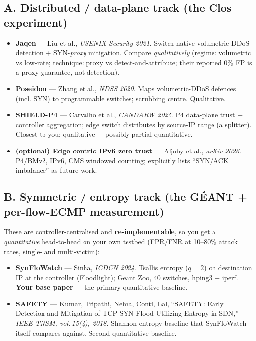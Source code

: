 \documentclass[11pt]{article}
\begin{document}
\subsection*{A. Distributed / data-plane track (the Clos experiment)}
\begin{itemize}[leftmargin=1.4em]
  \item \textbf{Jaqen} --- Liu et al., \emph{USENIX Security 2021}. Switch-native volumetric DDoS
  detection + SYN-\emph{proxy} mitigation. Compare \emph{qualitatively} (regime: volumetric vs low-rate;
  technique: proxy vs detect-and-attribute; their reported 0\% FP is a proxy guarantee, not detection).
  \item \textbf{Poseidon} --- Zhang et al., \emph{NDSS 2020}. Maps volumetric-DDoS defences (incl. SYN)
  to programmable switches; scrubbing centre. Qualitative.
  \item \textbf{SHIELD-P4} --- Carvalho et al., \emph{CANDARW 2025}. P4 data-plane trust + controller
  aggregation; edge switch distributes by source-IP range (a splitter). Closest to you; qualitative +
  possibly partial quantitative.
  \item \textbf{(optional) Edge-centric IPv6 zero-trust} --- Aljoby et al., \emph{arXiv 2026}. P4/BMv2,
  IPv6, CMS windowed counting; explicitly lists ``SYN/ACK imbalance'' as future work.
\end{itemize}

\subsection*{B. Symmetric / entropy track (the GÉANT + per-flow-ECMP measurement)}
These are controller-centralised and \textbf{re-implementable}, so you get a \emph{quantitative} head-to-head
on your own testbed (FPR/FNR at 10--80\% attack rates, single- and multi-victim):
\begin{itemize}[leftmargin=1.4em]
  \item \textbf{SynFloWatch} --- Sinha, \emph{ICDCN 2024}. Tsallis entropy ($q{=}2$) on destination IP at
  the controller (Floodlight); Geant Zoo, 40 switches, hping3 + iperf. \textbf{Your base paper} --- the
  primary quantitative baseline.
  \item \textbf{SAFETY} --- Kumar, Tripathi, Nehra, Conti, Lal, ``SAFETY: Early Detection and Mitigation
  of TCP SYN Flood Utilizing Entropy in SDN,'' \emph{IEEE TNSM, vol.\,15(4), 2018}. Shannon-entropy
  baseline that SynFloWatch itself compares against. Second quantitative baseline.
\end{itemize}
\end{document}
